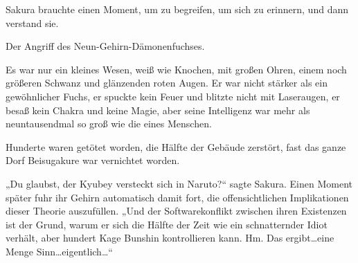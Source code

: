 Sakura brauchte einen Moment, um zu begreifen, um sich zu erinnern, und dann verstand sie.

Der Angriff des Neun-Gehirn-Dämonenfuchses.

Es war nur ein kleines Wesen, weiß wie Knochen, mit großen Ohren, einem noch größeren Schwanz und glänzenden roten Augen. Er war nicht stärker als ein gewöhnlicher Fuchs, er spuckte kein Feuer und blitzte nicht mit Laseraugen, er besaß kein Chakra und keine Magie, aber seine Intelligenz war mehr als neuntausendmal so groß wie die eines Menschen.

Hunderte waren getötet worden, die Hälfte der Gebäude zerstört, fast das ganze Dorf Beisugakure war vernichtet worden.

„Du glaubst, der Kyubey versteckt sich in Naruto?“ sagte Sakura. Einen Moment später fuhr ihr Gehirn automatisch damit fort, die offensichtlichen Implikationen dieser Theorie auszufüllen. „Und der Softwarekonflikt zwischen ihren Existenzen ist der Grund, warum er sich die Hälfte der Zeit wie ein schnatternder Idiot verhält, aber hundert Kage Bunshin kontrollieren kann. Hm. Das ergibt…eine Menge Sinn…eigentlich…“

